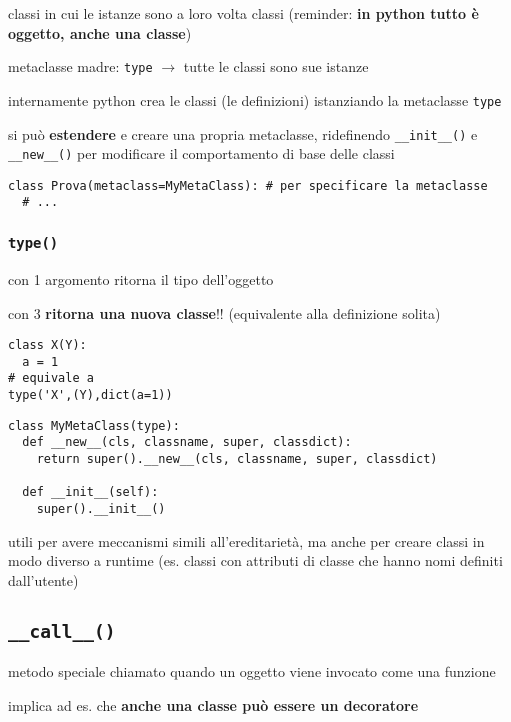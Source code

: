 classi in cui le istanze sono a loro volta classi (reminder: \textbf{in python tutto \`e oggetto, anche una classe})

metaclasse madre: \texttt{type} $\rightarrow$ tutte le classi sono sue istanze

internamente python crea le classi (le definizioni) istanziando la metaclasse \texttt{type}

si pu\`o \textbf{estendere} e creare una propria metaclasse, ridefinendo \texttt{__init__()} e \texttt{__new__()} per modificare il comportamento di base delle classi

\begin{verbatim}
class Prova(metaclass=MyMetaClass): # per specificare la metaclasse
  # ...
\end{verbatim}

\subsubsection{\texttt{type()}}

con 1 argomento ritorna il tipo dell'oggetto

con 3 \textbf{ritorna una nuova classe}!! (equivalente alla definizione solita)

\begin{verbatim}
class X(Y):
  a = 1
# equivale a
type('X',(Y),dict(a=1))
\end{verbatim}

\begin{verbatim}
class MyMetaClass(type):
  def __new__(cls, classname, super, classdict):
    return super().__new__(cls, classname, super, classdict)
  
  def __init__(self):
    super().__init__()
\end{verbatim}

utili per avere meccanismi simili all'ereditariet\`a, ma anche per creare classi in modo diverso a runtime (es. classi con attributi di classe che hanno nomi definiti dall'utente)

\subsection{\texttt{__call__()}}

metodo speciale chiamato quando un oggetto viene invocato come una funzione

implica ad es. che \textbf{anche una classe pu\`o essere un decoratore}


